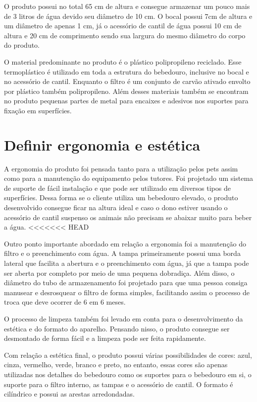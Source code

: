 \documentclass[
	12pt,				%
	openright,			%
	oneside,			%
	a4paper,			%
	english,			%
	french,				%
	spanish,			%
	brazil				%
	]{abntex2}
\begin{document}
O produto possui no total 65 cm de altura e consegue armazenar um pouco mais de 3 litros de água devido seu diâmetro de 10 cm. O bocal possui 7cm de altura e um diâmetro de apenas 1 cm, já o acessório de cantil de água possui 10 cm de altura e 20 cm de comprimento sendo sua largura do mesmo diâmetro do corpo do produto. 

O material predominante no produto é o plástico polipropileno reciclado. Esse termoplástico é utilizado em toda a estrutura do bebedouro, inclusive no bocal e no acessório de cantil. Enquanto o filtro é um conjunto de carvão ativado envolto por plástico também polipropileno. Além desses materiais também se encontram no produto pequenas partes de metal para encaixes e adesivos nos suportes para fixação em superfícies.


\section{Definir ergonomia e estética}

A ergonomia do produto foi pensada tanto para a utilização pelos pets assim como para a manutenção do equipamento pelos tutores. Foi projetado um sistema de suporte de fácil instalação e que pode ser utilizado em diversos tipos de superfícies. Dessa forma se o cliente utiliza um bebedouro elevado, o produto desenvolvido consegue ficar na altura ideal e caso o dono estiver usando o acessório de cantil suspenso os animais não precisam se abaixar muito para beber a água. 
<<<<<<< HEAD

Outro ponto importante abordado em relação a ergonomia foi a manutenção do filtro e o preenchimento com água. A tampa primeiramente possui uma borda lateral que facilita a abertura e o preenchimento com água, já que a tampa pode ser aberta por completo por meio de uma pequena dobradiça. Além disso, o diâmetro do tubo de armazenamento foi projetado para que uma pessoa consiga manusear e desrosquear o filtro de forma simples, facilitando assim o processo de troca que deve ocorrer de 6 em 6 meses. 

O processo de limpeza também foi levado em conta para o desenvolvimento da estética e do formato do aparelho. Pensando nisso, o produto consegue ser desmontado de forma fácil e a limpeza pode ser feita rapidamente.

Com relação a estética final, o produto possui várias possibilidades de cores: azul, cinza, vermelho, verde, branco e preto, no entanto, essas cores são apenas utilizadas nos detalhes do bebedouro como os suportes para o bebedouro em si, o suporte para o filtro interno, as tampas e o acessório de cantil. O formato é cilíndrico e possui as arestas arredondadas. 
\end{document}
